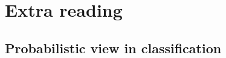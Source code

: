 \documentclass[serif, aspectratio=169]{beamer}
\begin{document}


    \section{Extra reading}
    \subsection{Probabilistic view in classification}

\end{document}
